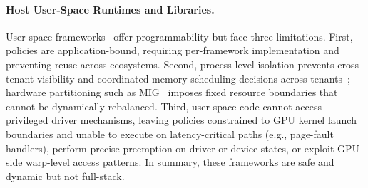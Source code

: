 \paragraph{Host User-Space Runtimes and Libraries.}
User-space frameworks~\cite{ng2023paella,gim2025pie,shen2025xsched,chen2025ktransformers,coppock2025lithos,strati2024orion} offer programmability but face three limitations.
First, policies are application-bound, requiring per-framework implementation and preventing reuse across ecosystems.
Second, process-level isolation prevents cross-tenant visibility and coordinated memory-scheduling decisions across tenants~\cite{xiao2018gandiva,yu2020fine}; hardware partitioning such as MIG~\cite{nvidia-mig} imposes fixed resource boundaries that cannot be dynamically rebalanced.
Third, user-space code cannot access privileged driver mechanisms, leaving policies constrained to GPU kernel launch boundaries and unable to execute on latency-critical paths (e.g., page-fault handlers), perform precise preemption on driver or device states, or exploit GPU-side warp-level access patterns.
In summary, these frameworks are safe and dynamic but not full-stack.
